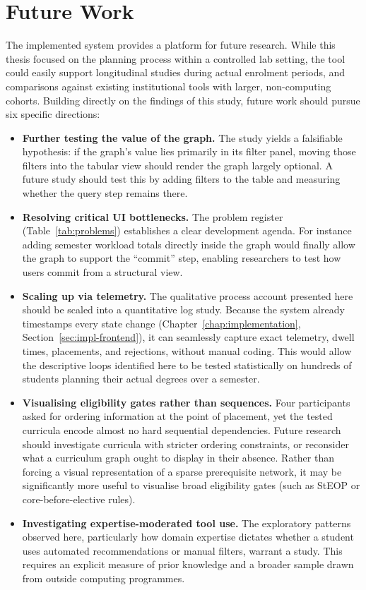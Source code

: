 \section{Future Work}
\label{sec:concl-future}

The implemented system provides a platform for future research. While this thesis focused on the planning process within a controlled lab setting, the tool could easily support longitudinal studies during actual enrolment periods, and comparisons against existing institutional tools with larger, non-computing cohorts. Building directly on the findings of this study, future work should pursue six specific directions:

\begin{itemize}
  \item \textbf{Further testing the value of the graph.} The study yields a falsifiable hypothesis: if the graph's value lies primarily in its filter panel, moving those filters into the tabular view should render the graph largely optional. A future study should test this by adding filters to the table and measuring whether the query step remains there.
  
  \item \textbf{Resolving critical UI bottlenecks.} The problem register (Table~\ref{tab:problems}) establishes a clear development agenda. For instance adding semester workload totals directly inside the graph would finally allow the graph to support the ``commit'' step, enabling researchers to test how users commit from a structural view.
  
  \item \textbf{Scaling up via telemetry.} The qualitative process account presented here should be scaled into a quantitative log study. Because the system already timestamps every state change (Chapter~\ref{chap:implementation}, Section~\ref{sec:impl-frontend}), it can seamlessly capture exact telemetry, dwell times, placements, and rejections, without manual coding. This would allow the descriptive loops identified here to be tested statistically on hundreds of students planning their actual degrees over a semester.
  
  \item \textbf{Visualising eligibility gates rather than sequences.} Four participants asked for ordering information at the point of placement, yet the tested curricula encode almost no hard sequential dependencies. Future research should investigate curricula with stricter ordering constraints, or reconsider what a curriculum graph ought to display in their absence. Rather than forcing a visual representation of a sparse prerequisite network, it may be significantly more useful to visualise broad eligibility gates (such as StEOP or core-before-elective rules).
  
  \item \textbf{Investigating expertise-moderated tool use.} The exploratory patterns observed here, particularly how domain expertise dictates whether a student uses automated recommendations or manual filters, warrant a study. This requires an explicit measure of prior knowledge and a broader sample drawn from outside computing programmes.
\end{itemize}